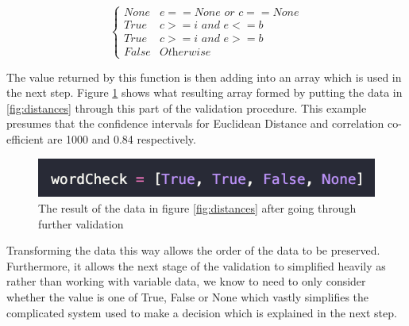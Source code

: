 \documentclass[10pt,a4paper]{report}
\begin{document}
\begin{equation}
	\begin{cases}
		\textit{None} & e == \textit{None or } c == \textit{None} \\
		\textit{True} & c >= i \textit{ and } e <= b \\
		\textit{True} & c >= i \textit{ and } e >= b \\
		\textit{False} & \textit{Otherwise}
	\end{cases}
	\label{fig:DistanceTransform}
\end{equation}

The value returned by this function is then adding into an array which is used in the next step. Figure \ref{fig:wordCheck} shows what resulting array formed by putting the data in \ref{fig:distances} through this part of the validation procedure. This example presumes that the confidence intervals for Euclidean Distance and correlation co-efficient are 1000 and 0.84 respectively.

\begin{figure}[h]
	\centering
	\includegraphics{WordCheck}
	\caption{The result of the data in figure \ref{fig:distances} after going through further validation}
	\label{fig:wordCheck}
\end{figure}

Transforming the data this way allows the order of the data to be preserved. Furthermore, it allows the next stage of the validation to simplified heavily as rather than working with variable data, we know to need to only consider whether the value is one of True, False or None which vastly simplifies the complicated system used to make a decision which is explained in the next step.
\end{document}
